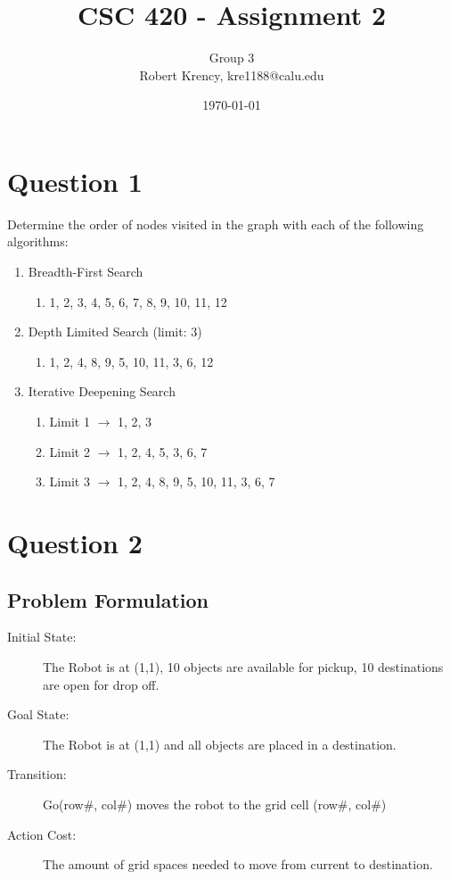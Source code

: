 \documentclass[12pt]{article}
\title{CSC 420 - Assignment 2}
\author{ Group 3 \\
        Robert Krency, kre1188@calu.edu}
\date{\today}
\begin{document}
\maketitle

\vspace{1cm}

\section{Question 1}

Determine the order of nodes visited in the graph with each of the following algorithms:

\begin{enumerate}
    \item Breadth-First Search
    \begin{enumerate}
        \item 1, 2, 3, 4, 5, 6, 7, 8, 9, 10, 11, 12
    \end{enumerate}

    \item Depth Limited Search (limit: 3)
    \begin{enumerate}
        \item 1, 2, 4, 8, 9, 5, 10, 11, 3, 6, 12
    \end{enumerate}

    \item Iterative Deepening Search
    \begin{enumerate}
        \item Limit 1 $\to$ 1, 2, 3
        \item Limit 2 $\to$ 1, 2, 4, 5, 3, 6, 7
        \item Limit 3 $\to$ 1, 2, 4, 8, 9, 5, 10, 11, 3, 6, 7
    \end{enumerate}

\end{enumerate}


\pagebreak
\section{Question 2}

\subsection{Problem Formulation}

\begin{description}
    \item[Initial State:] The Robot is at (1,1), 10 objects are available for pickup, 10 destinations are open for drop off.
    \item[Goal State:] The Robot is at (1,1) and all objects are placed in a destination.
    \item[Transition:] Go(row\#, col\#) moves the robot to the grid cell (row\#, col\#) 
    \item[Action Cost:] The amount of grid spaces needed to move from current to destination.  
\end{description}
\end{document}

